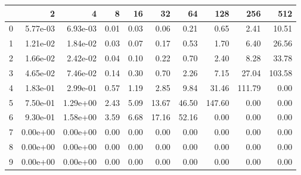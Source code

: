 \begin{tabular}{lrrrrrrrrr}
\toprule
{} &       2   &       4   &   8   &   16  &    32  &    64  &     128 &     256 &     512 \\
\midrule
0 &  5.77e-03 &  6.93e-03 &  0.01 &  0.03 &   0.06 &   0.21 &    0.65 &    2.41 &   10.51 \\
1 &  1.21e-02 &  1.84e-02 &  0.03 &  0.07 &   0.17 &   0.53 &    1.70 &    6.40 &   26.56 \\
2 &  1.66e-02 &  2.42e-02 &  0.04 &  0.10 &   0.22 &   0.70 &    2.40 &    8.28 &   33.78 \\
3 &  4.65e-02 &  7.46e-02 &  0.14 &  0.30 &   0.70 &   2.26 &    7.15 &   27.04 &  103.58 \\
4 &  1.83e-01 &  2.99e-01 &  0.57 &  1.19 &   2.85 &   9.84 &   31.46 &  111.79 &    0.00 \\
5 &  7.50e-01 &  1.29e+00 &  2.43 &  5.09 &  13.67 &  46.50 &  147.60 &    0.00 &    0.00 \\
6 &  9.30e-01 &  1.58e+00 &  3.59 &  6.68 &  17.16 &  52.16 &    0.00 &    0.00 &    0.00 \\
7 &  0.00e+00 &  0.00e+00 &  0.00 &  0.00 &   0.00 &   0.00 &    0.00 &    0.00 &    0.00 \\
8 &  0.00e+00 &  0.00e+00 &  0.00 &  0.00 &   0.00 &   0.00 &    0.00 &    0.00 &    0.00 \\
9 &  0.00e+00 &  0.00e+00 &  0.00 &  0.00 &   0.00 &   0.00 &    0.00 &    0.00 &    0.00 \\
\bottomrule
\end{tabular}

